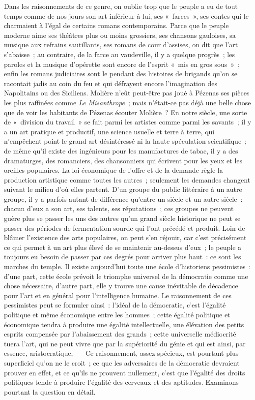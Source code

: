 \documentclass[french,twoside]{book} %
\begin{document}
Dans les raisonnements de ce genre, on oublie trop que le peuple a eu de tout temps comme de nos jours son art inférieur à lui, ses « farces », ses contes qui le charmaient à l’égal de certains romans contemporains. Parce que le peuple moderne aime ses théâtres plus ou moins grossiers, ses chansons gauloises, sa musique aux refrains sautillants, ses romans de cour d’assises, on dit que l’art s’abaisse ; au contraire, de la farce au vaudeville, il y a quelque progrès ; les paroles et la musique d’opérette sont encore  de l’esprit « mis en gros sous » ; enfin les romans judiciaires sont le pendant des histoires de brigands qu’on se racontait jadis au coin du feu et qui défrayent encore l’imagination des Napolitains ou des Siciliens. Molière n’eût peut-être pas joué à Pézenas ses pièces les plus raffinées comme \emph{Le Misanthrope} ; mais n’était-ce pas déjà une belle chose que de voir les habitants de Pézenas écouter Molière ? En notre siècle, une sorte de « division du travail » se fait parmi les artistes comme parmi les savants ; il y a un art pratique et productif, une science usuelle et terre à terre, qui n’empêchent point le grand art désintéressé ni la haute spéculation scientifique ; de même qu’il existe des ingénieurs pour les manufactures de tabac, il y a des dramaturges, des romanciers, des chansonniers qui écrivent pour les yeux et les oreilles populaires. La loi économique de l’offre et de la demande règle la production artistique comme toutes les autres ; seulement les demandes changent suivant le milieu d’où elles partent. D’un groupe du public littéraire à un autre groupe, il y a parfois autant de différence qu’entre un siècle et un autre siècle : chacun d’eux a son art, ses talents, ses réputations ; ces groupes ne peuvent guère plus se passer les uns des autres qu’un grand siècle historique ne peut se passer des périodes de fermentation sourde qui l’ont précédé et produit. Loin de blâmer l’existence des arts populaires, on peut s’en réjouir, car c’est précisément ce qui permet à un art plus élevé de se maintenir au-dessus d’eux ; le peuple a toujours eu besoin de passer par ces degrés pour arriver plus haut : ce sont les marches du temple.  Il existe aujourd’hui toute une école d’historiens pessimistes : d’une part, cette école prévoit le triomphe universel de la démocratie comme une chose nécessaire, d’autre part, elle y trouve une cause inévitable de décadence pour l’art et en général pour l’intelligence humaine. Le raisonnement de ces pessimistes peut se formuler ainsi : l’idéal de la démocratie, c’est l’égalité politique et même économique entre les hommes ; cette égalité politique et économique tendra à produire une égalité intellectuelle, une élévation des petits esprits compensée par l’abaissement des grands ; cette universelle médiocrité tuera l’art, qui ne peut vivre que par la supériorité du génie et qui est ainsi, par essence, aristocratique, — Ce raisonnement, assez spécieux, est pourtant plus superficiel qu’on ne le croit ; ce que les adversaires de la démocratie devraient prouver en effet, et ce qu’ils ne prouvent nullement, c’est que l’égalité des droits politiques tende à produire l’égalité des cerveaux et des aptitudes. Examinons pourtant la question en détail.\par
\end{document}
